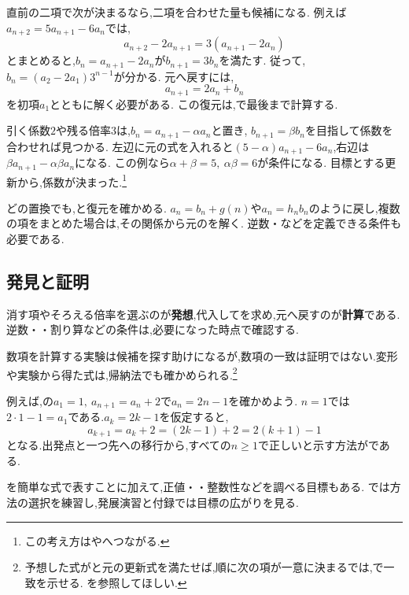     直前の二項で次が決まるなら,二項を合わせた量も候補になる.
    例えば$a_{n+2}=5a_{n+1}-6a_n$では,
    \[
      a_{n+2}-2a_{n+1}=3(a_{n+1}-2a_n)
    \]
    とまとめると,$b_n=a_{n+1}-2a_n$が$b_{n+1}=3b_n$を満たす.
    従って,$b_n=(a_2-2a_1)3^{n-1}$が分かる.
    元へ戻すには,
    \[
      a_{n+1}=2a_n+b_n
    \]
    を初項$a_1$とともに解く必要がある.
    この復元は,で最後まで計算する.

    引く係数$2$や残る倍率$3$は,$b_n=a_{n+1}-\alpha a_n$と置き,
    $b_{n+1}=\beta b_n$を目指して係数を合わせれば見つかる.
    左辺に元の式を入れると$(5-\alpha)a_{n+1}-6a_n$,右辺は$\beta a_{n+1}-\alpha\beta a_n$になる.
    この例なら$\alpha+\beta=5,\ \alpha\beta=6$が条件になる.
    目標とする更新から,係数が決まった.\footnote{この考え方はやへつながる.}

    どの置換でも,と復元を確かめる.
    $a_n=b_n+g(n)$や$a_n=h_nb_n$のように戻し,複数の項をまとめた場合は,その関係から元のを解く.
    逆数・などを定義できる条件も必要である.

  \subsection{発見と証明}

  消す項やそろえる倍率を選ぶのが\textbf{発想},代入してを求め,元へ戻すのが\textbf{計算}である.
  逆数・・割り算などの条件は,必要になった時点で確認する.

  数項を計算する実験は候補を探す助けになるが,数項の一致は証明ではない.変形や実験から得た式は,帰納法でも確かめられる.\footnote{予想した式がと元の更新式を満たせば,順に次の項が一意に決まるでは,で一致を示せる.
  を参照してほしい.}

  例えば,の$a_1=1,\ a_{n+1}=a_n+2$で$a_n=2n-1$を確かめよう.
  $n=1$では$2\cdot1-1=a_1$である.$a_k=2k-1$を仮定すると,
  \[
    a_{k+1}=a_k+2=(2k-1)+2=2(k+1)-1
  \]
  となる.出発点と一つ先への移行から,すべての$n\ge1$で正しいと示す方法が\mbox{}である.

  を簡単な式で表すことに加えて,正値・・整数性などを調べる目標もある.
  では方法の選択を練習し,発展演習と付録では目標の広がりを見る.

